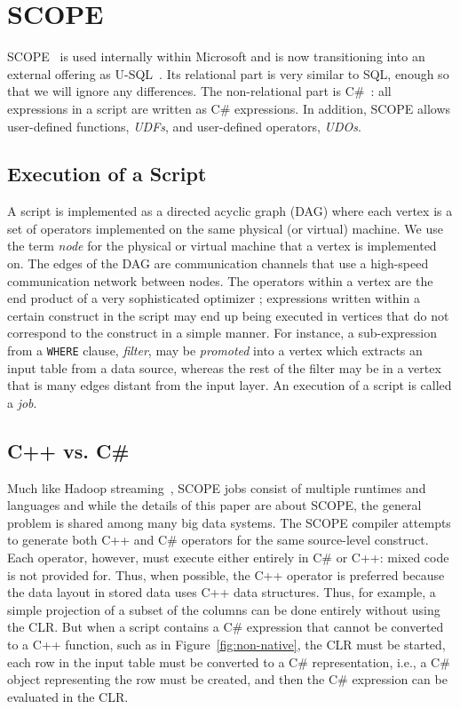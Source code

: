\section{SCOPE \label{sec:Scope}}

SCOPE~\cite{SCOPE} is used internally within Microsoft and is now transitioning into an external offering as U-SQL~\cite{usql}.
Its relational part is very similar to SQL, enough so that we will ignore any differences.
The non-relational part is C\#~\cite{Hejlsberg:2010:CPL:1951915}: all expressions in a script are written as C\# expressions.
In addition, SCOPE allows user-defined functions, {\em UDFs}, and user-defined operators, {\em UDOs}.

\subsection{Execution of a Script}
A script is implemented as a directed acyclic graph (DAG) where each vertex is a set of operators implemented on the same physical (or virtual) machine. We use the term {\it node} for the physical or virtual machine that a vertex is implemented on.
The edges of the DAG are communication channels that use a high-speed communication network between nodes.
The operators within a vertex are the end product of a very sophisticated optimizer \cite{}; expressions written within a certain construct in the script may end up being executed in vertices that do not correspond to the construct in a simple manner.
For instance, a sub-expression from a {\tt WHERE} clause, {\em filter}, may be {\it promoted} into a vertex which extracts an input table from a data source, whereas the rest of the filter may be in a vertex that is many edges distant from the input layer.
An execution of a script is called a {\em job}.

\subsection{C++ vs. C\#}
Much like Hadoop streaming~\cite{hadoop_stream}, SCOPE jobs consist of multiple runtimes and languages and while the details of this paper are about SCOPE, the general problem is shared among many big data systems.
The SCOPE compiler attempts to generate both C++ and C\# operators for the same source-level construct.
Each operator, however, must execute either entirely in C\# or C++: mixed code is not provided for.
Thus, when possible, the C++ operator is preferred because the data layout in stored data uses C++ data structures.
Thus, for example, a simple projection of a subset of the columns can be done entirely
without using the CLR.
But when a script contains a C\# expression that cannot be converted to a C++ function, such as in Figure~\ref{fig:non-native}, the CLR must be started, each row in the input table must be converted to a C\# representation, i.e., a C\# object representing the row must be created, and then the C\# expression can be evaluated in the CLR.

